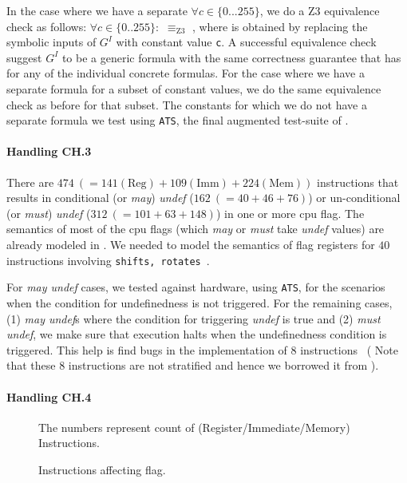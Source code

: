    In the case where we have a separate  $\forall c \in \{0...255\}$,
   we do a Z3 equivalence check as follows: $\forall c \in \{0..255\}:$
    $\equiv_\text{Z3}$ , where  is obtained by
   replacing the symbolic inputs of $G^I$ with constant value {\tt c}. A
   successful equivalence check suggest $G^I$ to be a generic formula with the
   same correctness guarantee that \Strata has for any of the individual
   concrete formulas. For the case where we have a separate formula for a subset
   of constant values, we do the same equivalence check as before for that
   subset. The constants for which we do not have a separate formula we test
    using {\tt ATS}, the final augmented test-suite of \Strata. 
    
    \paragraph{Handling CH.3} There are $474\ (= 141(\text{Reg}) +
        109(\text{Imm}) + 224(\text{Mem}))$ instructions that results in
    conditional  (or \emph{may}) \emph{undef} ($162\ (= 40 + 46 + 76)$) or
    un-conditional (or \emph{must}) \emph{undef} ($312\ (= 101 + 63 + 148)$)  in
    one or more cpu flag.  The semantics of most of the cpu flags (which
        \emph{may} or \emph{must} take \emph{undef} values) are already modeled
    in \Stoke. We needed to model the semantics of flag registers for $40$
    instructions involving {\tt shifts, rotates}~\cite{BugStoke986}. 
    
    For \emph{may undef} cases, we tested against hardware, using {\tt ATS}, for
    the scenarios when the condition for undefinedness is not triggered.  For
    the remaining cases, (1) \emph{may undef}s where the condition for
    triggering \emph{undef} is true and (2) \emph{must undef}, we make sure that
    \K execution halts when the undefinedness condition is triggered. This help
    is find bugs in the \Stoke implementation of $8$
    instructions~\cite{BugStoke986} ( Note that these $8$ instructions are not
        stratified and hence we borrowed it from \Stoke).   
    
    
   \paragraph{Handling CH.4}
   \begin{figure}[t]
       \centering
       \caption{Instructions affecting  flag.} The numbers represent count of (Register/Immediate/Memory) Instructions. 
       \label{fig:AD}
   \end{figure}


